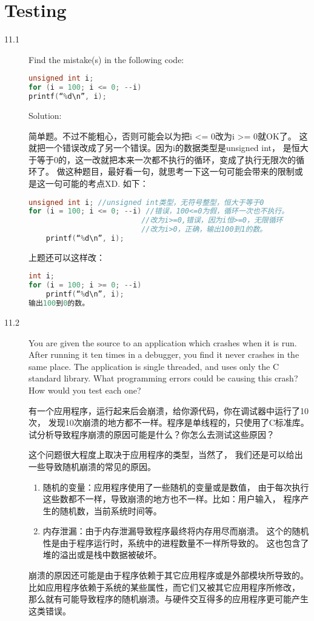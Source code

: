 \chapter{Testing}

\begin{description}
\item[11.1] Find the mistake(s) in the following code:	
\begin{lstlisting}[language=C++]
unsigned int i;
for (i = 100; i <= 0; --i)	
printf(“%d\n”, i);
\end{lstlisting}

Solution:

简单题。不过不能粗心，否则可能会以为把i <= 0改为i >= 0就OK了。 这就把一个错误改成了另一个错误。因为i的数据类型是unsigned int， 是恒大于等于0的，这一改就把本来一次都不执行的循环，变成了执行无限次的循环了。 做这种题目，最好看一句，就思考一下这一句可能会带来的限制或是这一句可能的考点XD. 如下：
\begin{lstlisting}[language=C++]
unsigned int i; //unsigned int类型，无符号整型，恒大于等于0
for (i = 100; i <= 0; --i) //错误，100<=0为假，循环一次也不执行。
                          //改为i>=0,错误，因为i恒>=0，无限循环
                          //改为i>0，正确，输出100到1的数。
    printf(“%d\n”, i);
\end{lstlisting}
上题还可以这样改：
\begin{lstlisting}[language=C++]
int i;
for (i = 100; i >= 0; --i)
    printf(“%d\n”, i);
输出100到0的数。
\end{lstlisting}
%


\item[11.2] You are given the source to an application which crashes when it is run. After running it ten times in a debugger, you find it never crashes in the same place. The application is single threaded, and uses only the C standard library. What programming errors could be causing this crash? How would you test each one?

有一个应用程序，运行起来后会崩溃，给你源代码，你在调试器中运行了10次， 发现10次崩溃的地方都不一样。程序是单线程的，只使用了C标准库。 试分析导致程序崩溃的原因可能是什么？你怎么去测试这些原因？

这个问题很大程度上取决于应用程序的类型，当然了， 我们还是可以给出一些导致随机崩溃的常见的原因。
\begin{enumerate}
\item 随机的变量：应用程序使用了一些随机的变量或是数值， 由于每次执行这些数都不一样，导致崩溃的地方也不一样。比如：用户输入， 程序产生的随机数，当前系统时间等。
\item 内存泄漏：由于内存泄漏导致程序最终将内存用尽而崩溃。 这个的随机性是由于程序运行时，系统中的进程数量不一样所导致的。 这也包含了堆的溢出或是栈中数据被破坏。
\end{enumerate}
崩溃的原因还可能是由于程序依赖于其它应用程序或是外部模块所导致的。 比如应用程序依赖于系统的某些属性，而它们又被其它应用程序所修改， 那么就有可能导致程序的随机崩溃。与硬件交互得多的应用程序更可能产生这类错误。


\end{description}
